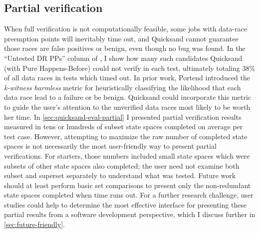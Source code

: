 \subsection{Partial verification}
\label{sec:quicksand-discussion-partial}

When full verification is not computationally feasible,
some jobs with data-race preemption points will inevitably time out,
and Quicksand cannot guarantee those races are
false positives or
benign, even though no bug was found.
In the ``Untested DR PPs'' column of ,
I show how many such candidates Quicksand (with Pure Happens-Before) could not verify in each test,
ultimately totaling 38\% of all data races in tests which timed out.
In prior work,
Portend introduced the {\em k-witness harmless} metric \cite{portend}
for heuristically classifying the likelihood that each data race lead to a failure or be benign.
Quicksand could incorporate this metric to guide the user's attention
to the unverified data races most likely to be worth her time.
%
In \cref{sec:quicksand-eval-partial} I presented partial verification results
measured in tens or hundreds of subset state spaces completed on average per test case.
However,
attempting to maximize the raw number of completed state spaces
is not necessarily the most user-friendly way to present partial verifications.
For starters, those numbers included small state spaces which were subsets of other state spaces also completed;
the user need not examine both subset and superset separately to understand what was tested.
Future work should at least perform basic set comparisons
to present only the non-redundant state spaces completed when time runs out.
For a further research challenge,
user studies could help to determine the most effective interface for presenting these partial results
from a software development perspective,
which I discuss further in \cref{sec:future-friendly}.

